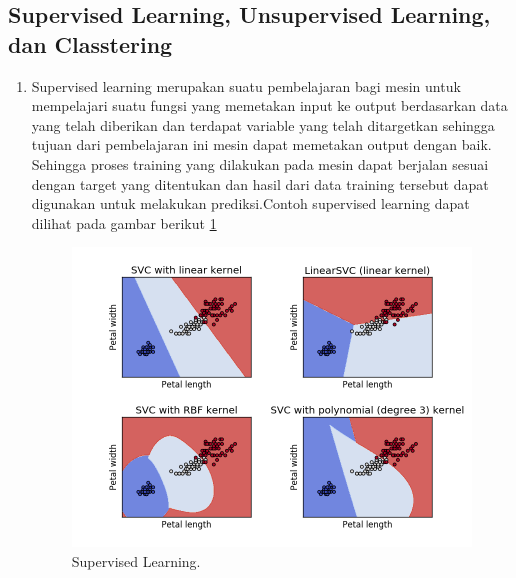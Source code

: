 \subsection{Supervised Learning, Unsupervised Learning, dan Classtering}
\begin{enumerate}
\item Supervised learning merupakan suatu pembelajaran bagi mesin untuk mempelajari suatu fungsi yang memetakan input ke output berdasarkan data yang telah diberikan dan terdapat variable yang telah ditargetkan sehingga tujuan dari pembelajaran ini mesin dapat memetakan output dengan baik. Sehingga proses training yang dilakukan pada mesin dapat berjalan sesuai dengan target yang ditentukan dan hasil dari data training tersebut dapat digunakan untuk melakukan prediksi.Contoh supervised learning dapat dilihat pada gambar berikut \ref{sl}
		\begin{figure}[ht]
		\centerline{\includegraphics[width=1\textwidth]{figures/im/im22.png}}
		\caption{Supervised Learning.}
		\label{sl}
		\end{figure}


\end{enumerate}
